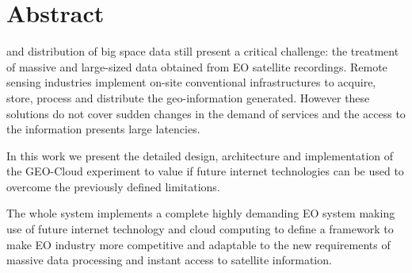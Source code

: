 \chapter{Abstract}

 and distribution of big space data still present a critical
challenge: the treatment of massive and large-sized data obtained from \acf{EO}
satellite recordings. Remote sensing industries implement on-site conventional
infrastructures to acquire, store, process and distribute the geo-information
generated. However these solutions do not cover sudden changes in the demand of
services and the access to the information presents large latencies.


In this work we present the detailed design, architecture and implementation of
the GEO-Cloud experiment to value if future internet technologies can be used to
overcome the previously defined limitations. 



The whole system implements a complete highly demanding \acs{EO} system making use of future internet technology and cloud computing to define a framework to make \acs{EO} industry more competitive and adaptable to the new requirements of massive data processing and instant access to satellite information.

